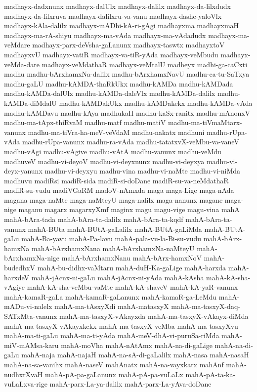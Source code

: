 {madhayx-dadxnunx
madhayx-dalUlx
madhayx-dalilx
madhayx-da-lilxdudx
madhayx-da-lilxruva
madhayx-dalilxru-va-vanu
madhayx-dashe-yaloVlx
madhayx-kAla-dalilx
madhayx-mADhi-kA-ri-gAgi
madhayxma
madhayxmaH
madhayx-ma-rA-shiyu
madhayx-ma-vAda
madhayx-ma-vAdadudx
madhayx-ma-veMdare
madhayx-parx-deVsha-gaLanunx
madhayx-taswtx
madhayxtoV
madhayxvU
madhayx-vatiR
madhayx-va-tiR-yAda
madhayx-veMbudu
madhayx-veMda-dare
madhayx-veMdathaR
madhayx-veMtalU
madheyx
madhi-ga-caCxti
madhu
madhu-bArxhamxNa-dalilx
madhu-bArxhamxNavU
madhu-ca-tu-SaTxya
madhu-gaLU
madhu-kAMDA-thaRkUkx
madhu-kAMDa
madhu-kAMDada
madhu-kAMDa-dalUlx
madhu-kAMDa-daleVlx
madhu-kAMDa-dalilx
madhu-kAMDa-diMdalU
madhu-kAMDakUkx
madhu-kAMDakekx
madhu-kAMDa-vAda
madhu-kAMDavu
madhu-kAya
madhukaH
madhu-kaSx-ranitx
madhu-mAnonxV
madhu-ma-tApx-thiRvaM
madhu-matf
madhu-matiV
madhu-ma-tiVmaMtarx-vanunx
madhu-ma-tiVra-ha-meV-veVdaM
madhu-nakatx
madhuni
madhu-rUpa-vAda
madhu-rUpa-vanunx
madhu-ra-vAda
madhu-tatatxvX-veMbu-va-vaneV
madhu-vAgi
madhu-vAgive
madhu-vAtA
madhu-vanunx
madhu-veMdu
madhuveV
madhu-vi-deyoV
madhu-vi-deyxnunx
madhu-vi-deyxya
madhu-vi-deyx-yanunx
madhu-vi-deyxyu
madhu-vina
madhu-vi-naMte
madhu-vi-niMda
madhuvu
madiRsi
madiR-sida
madiR-si-doDane
madiR-su-va-neMdathaR
madiR-su-vudu
madiVGaRM
madoV-nAmxda
maga
maga-Lige
maga-nAda
magana
maga-naMte
maga-naMteyU
maga-nalilx
maga-nanunx
magane
maga-nige
maganu
magarx
magarxyXmf
maginx
magu
magu-vige
magu-vina
mahA
mahA-bAra-tada
mahA-bAra-ta-dalilx
mahA-bAra-ta-kqdf
mahA-bAra-ta-vanunx
mahA-BUta
mahA-BUtA-gaLalilx
mahA-BUtA-gaLiMda
mahA-BUtA-gaLu
mahA-Ba-yavu
mahA-Pa-lavu
mahA-pala-vu-la-Bi-su-vudu
mahA-bArx-hamxNa
mahA-bArxhamxNana
mahA-bArxhamxNa-naMteyU
mahA-bArxhamxNa-nige
mahA-bArxhamxNanu
mahA-bArx-hamxNoV
mahA-budedhxV
mahA-bu-didhx-vaMtaru
mahA-duH-Ka-gaLige
mahA-harxda
mahA-harxdeV
mahA-jAcnx-ni-gaLu
mahA-jAcnx-ni-yAda
mahA-kAsha
mahA-kA-sha-vAgiye
mahA-kA-sha-veMbu-vaMte
mahA-kA-shaveV
mahA-kA-yaR-vanunx
mahA-kamaR-gaLa
mahA-kamaR-gaLanunx
mahA-kamaR-ga-LeMdu
mahA-mADu-vi-nalelx
mahA-ma-tAsxyXdi
mahA-matasxyX
mahA-ma-tasxyX-daq-SATxMta-vanunx
mahA-ma-tasxyX-vAkayxda
mahA-ma-tasxyX-vAkayx-diMda
mahA-ma-tasxyX-vAkayxkekx
mahA-ma-tasxyX-veMba
mahA-ma-tasxyXvu
mahA-ma-ti-gaLu
mahA-ma-ti-yAda
mahA-meV-dhA-vi-puruSa-riMda
mahA-miV-mAMsa-karu
mahA-moVha
mahA-nAtAmx
mahA-na-di-gaLige
mahA-na-di-gaLu
mahA-naja
mahA-najaH
mahA-na-sA-di-gaLalilx
mahA-nasa
mahA-nasaH
mahA-na-sa-vanihx
mahA-naseV
mahAnatx
mahA-na-vayxkatx
mahAnf
mahA-nudhxrXvaH
mahA-pA-pa-gaLanunx
mahA-pA-pa-vuLaLx
mahA-pA-ta-ka-vuLaLxva-rige
mahA-parx-La-ya-dalilx
mahA-parx-La-yAva-doDane
}
